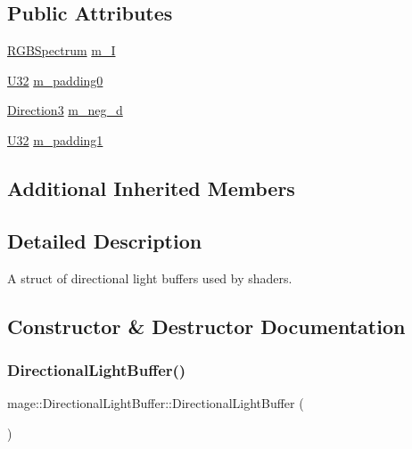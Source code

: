 \subsection*{Public Attributes}
\begin{DoxyCompactItemize}
\item 
\hyperlink{structmage_1_1_r_g_b_spectrum}{R\+G\+B\+Spectrum} \hyperlink{structmage_1_1_directional_light_buffer_a357b86deb8ed2926cb77ed8191e967e6}{m\+\_\+I}
\item 
\hyperlink{namespacemage_a41c104c036fba3756a74e19f793eeaa1}{U32} \hyperlink{structmage_1_1_directional_light_buffer_aac8d40f7af8eac8b2fb79085843be4fd}{m\+\_\+padding0}
\item 
\hyperlink{structmage_1_1_direction3}{Direction3} \hyperlink{structmage_1_1_directional_light_buffer_af3a1952cf82b66730868573a4b581ab4}{m\+\_\+neg\+\_\+d}
\item 
\hyperlink{namespacemage_a41c104c036fba3756a74e19f793eeaa1}{U32} \hyperlink{structmage_1_1_directional_light_buffer_ab94c0c42a54c9751dde8a4a2a84da861}{m\+\_\+padding1}
\end{DoxyCompactItemize}
\subsection*{Additional Inherited Members}


\subsection{Detailed Description}
A struct of directional light buffers used by shaders. 

\subsection{Constructor \& Destructor Documentation}
\hypertarget{structmage_1_1_directional_light_buffer_a73a87ba7b016b6c62375da62b4fdf7b6}{}\label{structmage_1_1_directional_light_buffer_a73a87ba7b016b6c62375da62b4fdf7b6} 
\subsubsection{\texorpdfstring{Directional\+Light\+Buffer()}{DirectionalLightBuffer()}\hspace{0.1cm}{\footnotesize\ttfamily [1/3]}}
{\footnotesize\ttfamily mage\+::\+Directional\+Light\+Buffer\+::\+Directional\+Light\+Buffer (\begin{DoxyParamCaption}{ }\end{DoxyParamCaption})}

